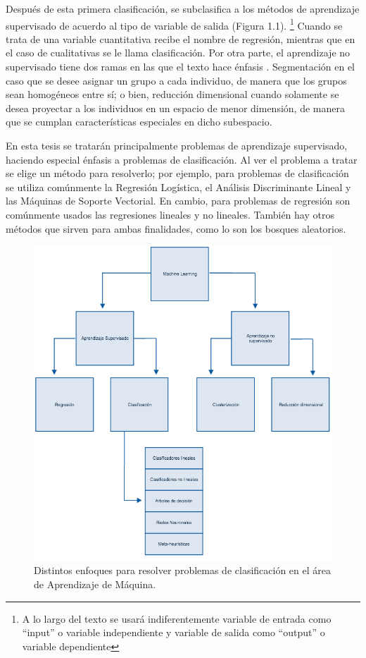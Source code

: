 Después de esta primera clasificación, se subclasifica a los métodos de aprendizaje supervisado de acuerdo al tipo de variable de salida (Figura 1.1). \footnote{A lo largo del texto se usará indiferentemente variable de entrada como ``input'' o variable independiente y variable de salida como ``output'' o variable dependiente} Cuando se trata de una variable cuantitativa recibe el nombre de regresión, mientras que en el caso de cualitativas se le llama clasificación. Por otra parte, el aprendizaje no supervisado tiene dos ramas en las que el texto hace énfasis \cite{hastie2009elements}. Segmentación en el caso que se desee asignar un grupo a cada individuo, de manera que los grupos sean homogéneos entre sí; o bien, reducción dimensional cuando solamente se desea proyectar a los individuos en un espacio de menor dimensión, de manera que se cumplan características especiales en dicho subespacio. 

En esta tesis se tratarán principalmente problemas de aprendizaje supervisado, haciendo especial énfasis a problemas de clasificación. Al ver el problema a tratar se elige un método para resolverlo; por ejemplo, para problemas de clasificación se utiliza comúnmente la Regresión Logística, el Análisis Discriminante Lineal y las Máquinas de Soporte Vectorial. En cambio, para problemas de regresión son comúnmente usados las regresiones lineales y no lineales. También hay otros métodos que sirven para ambas finalidades, como lo son los bosques aleatorios. 

\begin{figure}[!ht]
  \centering
	\includegraphics[width=1\textwidth]{Figures/Chapter1_Clasificacion}	
  \caption[Enfoques para resolver problemas de clasificación]
  {Distintos enfoques para resolver problemas de clasificación en el área de Aprendizaje de Máquina.}
\end{figure}

